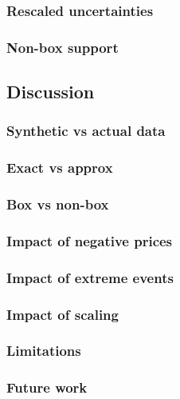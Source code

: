\documentclass[11pt]{article}
\theoremstyle{plain}
\theoremstyle{definition}
\begin{document}
\subsubsection{Rescaled uncertainties}
\subsubsection{Non-box support}
\subsection{Discussion}
\subsubsection{Synthetic vs actual data}
\subsubsection{Exact vs approx}
\subsubsection{Box vs non-box}
\subsubsection{Impact of negative prices}
\subsubsection{Impact of extreme events}
\subsubsection{Impact of scaling}
\subsubsection{Limitations}
\subsubsection{Future work}
\end{document}
